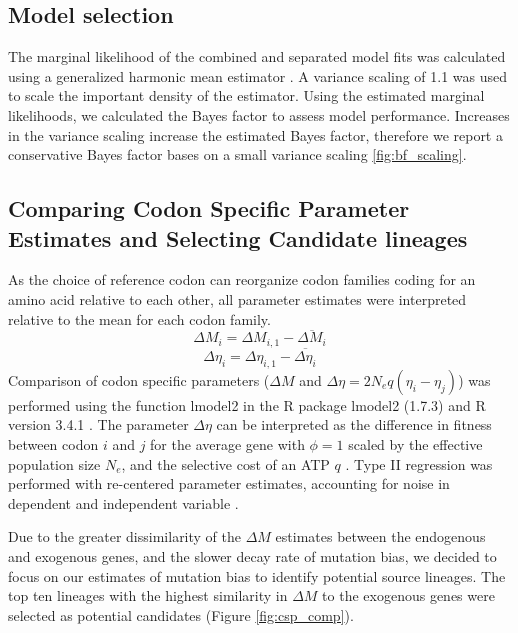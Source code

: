 \documentclass[doublespacing,linenumbers]{bmcart}
\newcommand{\DM}{\ensuremath{{\Delta M}}\xspace}
\newcommand{\DE}{\ensuremath{{\Delta \eta}}\xspace}
\newcommand{\Ne}{\ensuremath{N_e}\xspace}
\begin{document}
\subsection*{Model selection}
The marginal likelihood of the combined and separated model fits was calculated using a generalized harmonic mean estimator \citep{Gronau2017}. A variance scaling of 1.1 was used to scale the important density of the estimator. Using the estimated marginal likelihoods, we calculated the Bayes factor to assess model performance. 
Increases in the variance scaling increase the estimated Bayes factor, therefore we report a conservative Bayes factor bases on a small variance scaling \ref{fig:bf_scaling}.

\subsection*{Comparing Codon Specific Parameter Estimates and Selecting Candidate lineages}
As the choice of reference codon can reorganize codon families coding for an amino acid relative to each other, all parameter estimates were interpreted relative to the mean for each codon family.
\begin{equation}
\DM_i = \DM_{i,1} - \overline{\DM_i}
\end{equation}
\begin{equation}
\DE_i = \DE_{i,1} - \overline{\DE_i}
\end{equation}
Comparison of codon specific parameters (\DM and $\DE = 2\Ne q(\eta_i-\eta_j)$) was performed using the function lmodel2 in the R package lmodel2 (1.7.3) \citep{lmodel2} and R version 3.4.1 \citep{rcore}.
The parameter \DE can be interpreted as the difference in fitness between codon $i$ and $j$ for the average gene with $\phi = 1$ scaled by the  effective population size $\Ne$, and the selective cost of an ATP $q$ \citep{gilchrist2007, gilchrist2015}.
Type II regression was performed with re-centered parameter estimates, accounting for noise in dependent and independent variable \citep{SokalAndRohlf1981}.

Due to the greater dissimilarity of the \DM estimates between the endogenous and exogenous genes, and the slower decay rate of mutation bias, we decided to focus on our estimates of mutation bias to identify potential source lineages.
The top ten lineages with the highest similarity in \DM to the exogenous genes were selected as potential candidates (Figure \ref{fig:csp_comp}).
\end{document}
